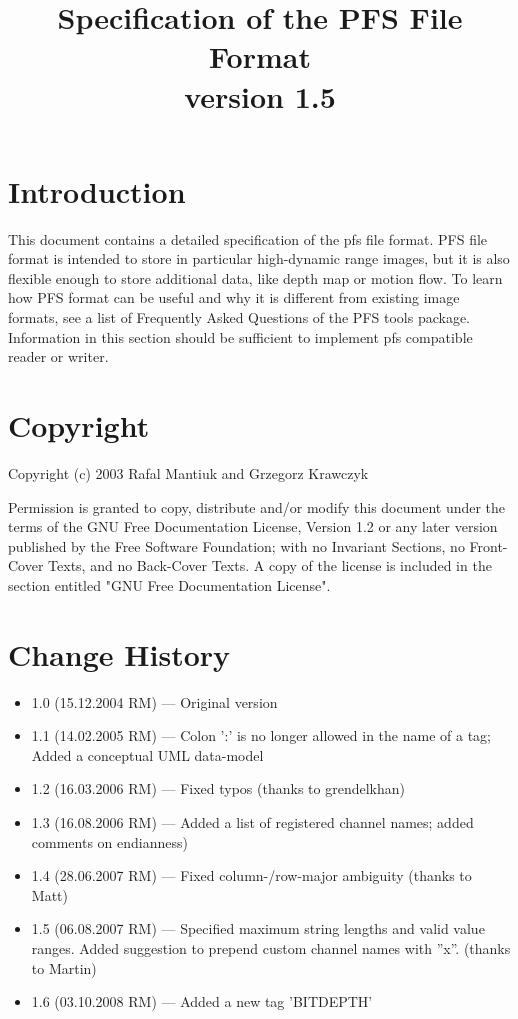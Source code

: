 \documentclass[a4paper,12pt,english]{article}
\begin{document}
\title{Specification of the PFS File Format\\version 1.5}

\maketitle

\section{Introduction}

This document contains a detailed specification of the pfs file
format. PFS file format is intended to store in particular
high-dynamic range images, but it is also flexible enough to store
additional data, like depth map or motion flow. To learn how PFS
format can be useful and why it is different from existing image
formats, see a list of Frequently Asked Questions of the PFS tools
package. Information in this section should be sufficient to implement
pfs compatible reader or writer.

\section{Copyright}

Copyright (c)  2003  Rafal Mantiuk and Grzegorz Krawczyk

Permission is granted to copy, distribute and/or modify this document
under the terms of the GNU Free Documentation License, Version 1.2 or
any later version published by the Free Software Foundation; with no
Invariant Sections, no Front-Cover Texts, and no Back-Cover Texts.  A
copy of the license is included in the section entitled "GNU Free
Documentation License".

\section{Change History}

\begin{itemize}
\item 1.0 (15.12.2004 RM) --- Original version
\item 1.1 (14.02.2005 RM) --- Colon ':' is no longer allowed in the name of a tag; Added a conceptual UML data-model
\item 1.2 (16.03.2006 RM) --- Fixed typos (thanks to grendelkhan)
\item 1.3 (16.08.2006 RM) --- Added a list of registered channel names; added comments on endianness)
\item 1.4 (28.06.2007 RM) --- Fixed column-/row-major ambiguity (thanks to Matt)
\item 1.5 (06.08.2007 RM) --- Specified maximum string lengths and valid value ranges. Added suggestion to prepend custom channel names with ''x''. (thanks to Martin)
\item 1.6 (03.10.2008 RM) --- Added a new tag 'BITDEPTH'
\end{itemize}
\end{document}
